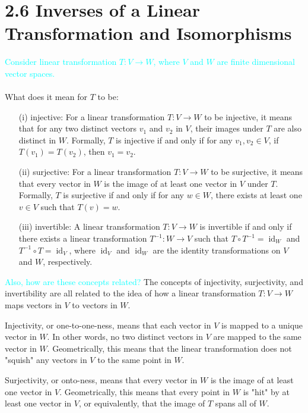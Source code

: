 \documentclass[fontsize=12pt]{scrartcl}
\begin{document}
\newpage

\section{2.6 Inverses of a Linear Transformation and Isomorphisms}

\bigskip

\noindent
\textcolor{cyan}{Consider linear transformation $T: V \to W$, where $V$ and $W$ are finite dimensional vector spaces.}\\
\\
What does it mean for $T$ to be:
\begin{itemize}
    \item[(i)] injective: For a linear transformation $T: V \to W$ to be injective, it means that for any two distinct vectors $v_1$ and $v_2$ in $V$, their images under $T$ are also distinct in $W$. Formally, $T$ is injective if and only if for any $v_1, v_2 \in V$, if $T(v_1) = T(v_2)$, then $v_1 = v_2$.
    \item[(ii)] surjective: For a linear transformation $T: V \to W$ to be surjective, it means that every vector in $W$ is the image of at least one vector in $V$ under $T$. Formally, $T$ is surjective if and only if for any $w \in W$, there exists at least one $v \in V$ such that $T(v) = w$.
    \item[(iii)] invertible: A linear transformation $T: V \to W$ is invertible if and only if there exists a linear transformation $T^{-1}: W \to V$ such that $T \circ T^{-1} = \operatorname{id}_W$ and $T^{-1} \circ T = \operatorname{id}_V$, where $\operatorname{id}_V$ and $\operatorname{id}_W$ are the identity transformations on $V$ and $W$, respectively.
\end{itemize}

\medskip

\noindent
\textcolor{cyan}{Also, how are these concepts related?}
\noindent
The concepts of injectivity, surjectivity, and invertibility are all related to the idea of how a linear transformation $T: V \to W$ maps vectors in $V$ to vectors in $W$.

\noindent
Injectivity, or one-to-one-ness, means that each vector in $V$ is mapped to a unique vector in $W$. In other words, no two distinct vectors in $V$ are mapped to the same vector in $W$. Geometrically, this means that the linear transformation does not "squish" any vectors in $V$ to the same point in $W$.

\noindent
Surjectivity, or onto-ness, means that every vector in $W$ is the image of at least one vector in $V$. Geometrically, this means that every point in $W$ is "hit" by at least one vector in $V$, or equivalently, that the image of $T$ spans all of $W$.
\end{document}
